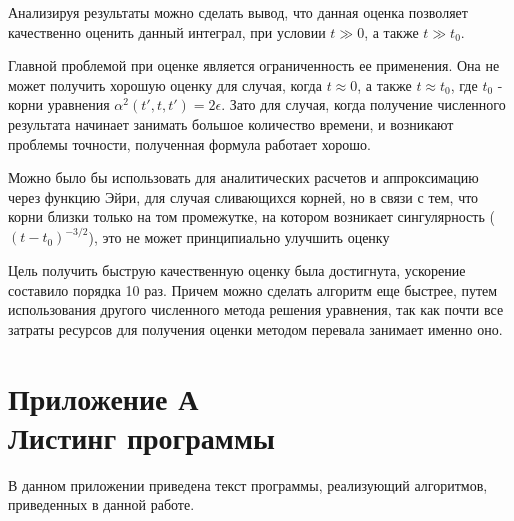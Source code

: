 \documentclass[14pt]{article}
\numberwithin{figure}{section}
\numberwithin{equation}{section}
\begin{document}
Анализируя результаты можно сделать вывод, что данная оценка позволяет качественно оценить данный интеграл, при условии $t \gg 0$, а также $t \gg t_0$.

Главной проблемой при оценке является ограниченность ее применения. Она не может получить хорошую оценку для случая, когда $t \approx 0$, а также $t \approx t_0$, где $t_0$ - корни уравнения $\alpha^2(t', t, t') = 2\epsilon$. Зато для случая, когда получение численного результата начинает занимать большое количество времени, и возникают проблемы точности, полученная формула работает хорошо. 

Можно было бы использовать для аналитических расчетов и аппроксимацию через функцию Эйри, для случая сливающихся корней, но в связи с тем, что корни близки только на том промежутке, на котором возникает сингулярность ($(t-t_0)^{-3/2}$), это не может принципиально улучшить оценку

Цель получить быструю качественную оценку была достигнута, ускорение составило порядка 10 раз. Причем можно сделать алгоритм еще быстрее, путем использования другого численного метода решения уравнения, так как почти все затраты ресурсов для получения оценки методом перевала занимает именно оно.


\newpage
{}
%


\newpage
{}
\section*{Приложение А\\Листинг программы}\label{attachA}

В данном приложении приведена текст программы, реализующий алгоритмов, приведенных в данной работе.


\end{document}
